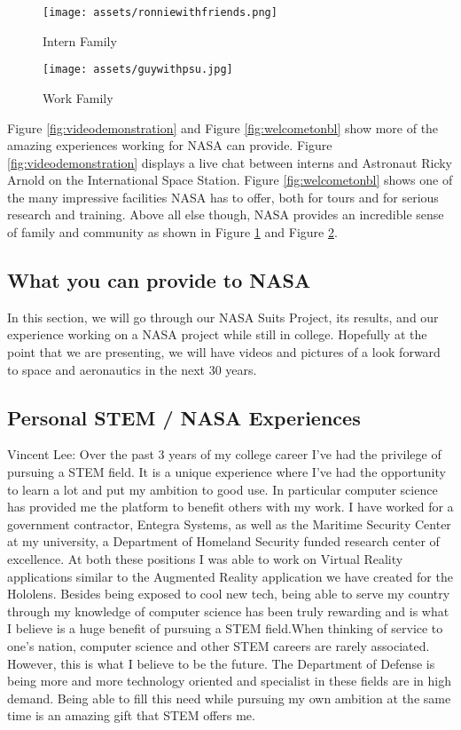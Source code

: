 \documentclass{article}
\let\Oldsubsection\subsection
\renewcommand{\subsection}{\FloatBarrier\Oldsubsection}
\begin{document}
\begin{figure}[!htb]
  \centering
  \texttt{[image: assets/ronniewithfriends.png]}
  \caption{Intern Family}
  \label{fig:ronniewithfriends}
\end{figure}

\begin{figure}[!htb]
  \centering
  \texttt{[image: assets/guywithpsu.jpg]}
  \caption{Work Family}
  \label{fig:guywithpsu}
\end{figure}

Figure \ref{fig:videodemonstration} and Figure \ref{fig:welcometonbl} show more of the amazing experiences working for NASA can provide. Figure \ref{fig:videodemonstration} displays a live chat between interns and Astronaut Ricky Arnold on the International Space Station. Figure \ref{fig:welcometonbl} shows one of the many impressive facilities NASA has to offer, both for tours and for serious research and training. Above all else though, NASA provides an incredible sense of family and community as shown in Figure \ref{fig:ronniewithfriends} and Figure \ref{fig:guywithpsu}.

\subsection{What you can provide to NASA}

In this section, we will go through our NASA Suits Project, its results, and our experience working on a NASA project while still in college. Hopefully at the point that we are presenting, we will have videos and pictures of a look forward to space and aeronautics in the next 30 years.

\subsection{Personal STEM / NASA Experiences}

Vincent Lee: Over the past 3 years of my college career I've had  the privilege of pursuing a STEM field. It is a unique experience where I’ve had the opportunity to learn a lot and put my ambition to good use. In particular computer science has provided me the platform to benefit others with my work. I have worked for a government contractor, Entegra Systems, as well as the Maritime Security Center at my university, a Department of Homeland Security funded research center of excellence. At both these positions I was able to work on Virtual Reality applications similar to the Augmented Reality application we have created for the Hololens. Besides being exposed to cool new tech, being able to serve my country through my knowledge of computer science has been truly rewarding and is what I believe is a huge benefit of pursuing a STEM field.When thinking of service to one’s nation, computer science and other STEM careers are rarely associated. However, this is what I believe to be the future. The Department of Defense is being more and more technology oriented and specialist in these fields are in high demand. Being able to fill this need while pursuing my own ambition at the same time is an amazing gift that STEM offers me.
\end{document}
